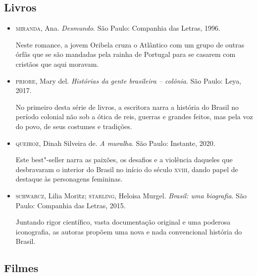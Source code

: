 \documentclass[12pt]{extarticle}
\begin{document}
\subsection{Livros}

\begin{itemize}
\item\textsc{miranda}, Ana. \textit{Desmundo}. São Paulo: Companhia das Letras, 1996.

Neste romance, a jovem Oribela cruza o Atlântico com um grupo de outras
órfãs que se são mandadas pela rainha de Portugal para se casarem com
cristãos que aqui moravam.

\item\textsc{priore}, Mary del. \textit{Histórias da gente brasileira -- colônia}. São Paulo: Leya, 2017.

No primeiro desta série de livros, a escritora narra a história do
Brasil no período colonial não sob a ótica de reis, guerras e grandes
feitos, mas pela voz do povo, de seus costumes e tradições.

\item\textsc{queiroz}, Dinah Silveira de. \textit{A muralha}. São Paulo: Instante,
2020.

Este best"-seller narra as paixões, os desafios e a violência daqueles
que desbravaram o interior do Brasil no início do século \textsc{xviii}, dando
papel de destaque às personagens femininas.

\item\textsc{schwarcz}, Lilia Moritz; \textsc{starling}, Heloisa Murgel. \textit{Brasil: uma biografia}. São Paulo: Companhia das Letras, 2015.

Juntando rigor científico, vasta documentação original e uma poderosa
iconografia, as autoras propõem uma nova e nada convencional história do
Brasil.
\end{itemize}

\subsection{Filmes}
\end{document}
